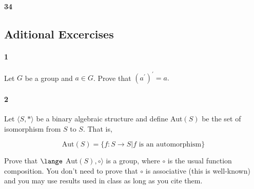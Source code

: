 \documentclass{article}
\begin{document}
\paragraph{34}

\subsection*{Aditional Excercises}

\paragraph{1} Let $G$ be a group and $a \in G$. Prove that $(a^\prime)^\prime
= a.$

\paragraph{2} Let $\langle S,* \rangle$ be a binary algebraic
structure and define Aut$(S)$ be the set of isomorphism from $S$ to
$S$. That is,

\[\text{Aut}(S) = \{f:S\rightarrow S| f \text{ is an automorphism}\} \]

Prove that $\lange$ Aut$(S) , \circ \rangle$ is a group, where $\circ$
is the usual function composition. You don't need to prove that
$\circ$ is associative (this is well-known) and you may use results
used in class as long as you cite them.
\end{document}
